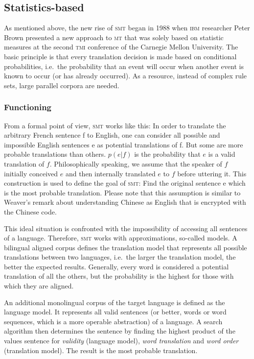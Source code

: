\documentclass[output=paper]{LSP/langsci}
\begin{document}
\subsection{Statistics-based}\label{sec:stein:3.2}

As mentioned above, the new rise of \textsc{smt} began in 1988 when \textsc{ibm} researcher Peter Brown presented a new approach to \textsc{mt} that was solely based on statistic measures \citep{Brown1988} at the second \textsc{tmi} conference of the Carnegie Mellon University. The basic principle is that every translation decision is made based on conditional probabilities, i.e.\ the probability that an event will occur when another event is known to occur (or has already occurred). As a resource, instead of complex rule sets, large parallel corpora are needed.

\subsubsection{Functioning}\label{sec:stein:3.2.1}

From a formal point of view, \textsc{smt} works like this: In order to translate the arbitrary French sentence f to English, one can consider all possible and impossible English sentences e as potential translations of f. But some are more probable translations than others. $p(e|f)$ is the probability that $e$ is a valid translation of $f$. Philosophically speaking, we assume that the speaker of $f$ initially conceived $e$ and then internally translated $e$ to $f$ before uttering it. This construction is used to define the goal of \textsc{smt}: Find the original sentence e which is the most probable translation. Please note that this assumption is similar to Weaver's remark about understanding Chinese as English that is encrypted with the Chinese code.

This ideal situation is confronted with the impossibility of accessing all sentences of a language. Therefore, \textsc{smt} works with approximations, so-called models. A bilingual aligned corpus defines the translation model that represents all possible translations between two languages, i.e.\ the larger the translation model, the better the expected results. Generally, every word is considered a potential translation of all the others, but the probability is the highest for those with which they are aligned.

An additional monolingual corpus of the target language is defined as the language model. It represents all valid sentences (or better, words or word sequences, which is a more operable abstraction) of a language. A search algorithm then determines the sentence by finding the highest product of the values sentence for \textit{validity} (language model), \textit{word translation} and \textit{word order} (translation model). The result is the most probable translation.
\end{document}
